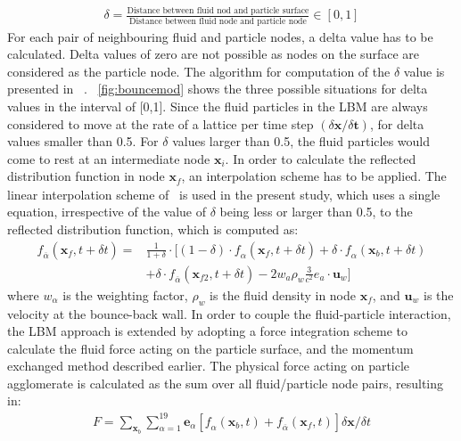 \begin{eqnarray}
\delta = \frac{\mbox{Distance between fluid nod and particle surface}}{\mbox{Distance between fluid node and particle node}} \in [0,1]
\end{eqnarray} 
For each pair of neighbouring fluid and particle nodes, a delta value has to be calculated. Delta values of zero are not possible as nodes on the surface are considered as the particle node. The algorithm for computation of the $\delta$ value is presented in ~\citet{Iglberger2008}. ~\cref{fig:bouncemod} shows the three possible situations for delta values in the interval of [0,1]. Since the fluid particles in the LBM are always considered to move at the rate of a lattice per time step $(\delta \mathbf{x}/ \delta \mathbf{t})$, for delta values smaller than 0.5. For $\delta$ values larger than 0.5, the fluid particles would come to rest at an intermediate node $\mathbf{x}_{\mathit{i}}$. In order to calculate the reflected distribution function in node $\mathbf{x}_{\mathit{f}}$, an interpolation scheme has to be applied. The linear interpolation scheme of~\citet{Yu2003a, Yu2003} is used in the present study, which uses a single equation, irrespective of the value of $\delta$ being less or larger than 0.5, to the reflected distribution function, which is computed as:
\begin{eqnarray}
 \nonumber
\mathit{\mathit{f}}_{\overline{\alpha}}(\mathbf{x}_{\mathit{f}},t + \delta t) = & \frac{1}{1 + \delta} \cdot [(1-\delta)\cdot \mathit{\mathit{f}}_{\alpha}(\mathbf{x}_{\mathit{f}},t + \delta t) + \delta \cdot \mathit{\mathit{f}}_{\alpha}(\mathbf{x}_{\mathit{b}},t + \delta t)  \\
& + \delta \cdot \mathit{\mathit{f}}_{\overline{\alpha}}(\mathbf{x}_{\mathit{f2}},t + \delta t) -2\mathit{w}_{\mathit{a}}\rho_{\mathit{w}}\frac{3}{\mathit{c}^{2}}\mathbf{\mathit{e}}_{\mathit{a}}\cdot \mathbf{u}_{\mathit{w}}]
\end{eqnarray}
where $\mathit{w}_{\alpha}$ is the weighting factor, $\rho_{\mathit{w}}$ is the fluid density in node $\mathbf{x}_{\mathit{f}}$, and $ \mathbf{u}_{\mathit{w}}  $ is the velocity at the bounce-back wall. In order to couple the fluid-particle interaction, the LBM approach is extended by adopting a force integration scheme to calculate the fluid force acting on the particle surface, and the momentum exchanged method described earlier. The physical force acting on particle agglomerate is calculated as the sum over all fluid/particle node pairs, resulting in: 
\begin{eqnarray}
\mathit{F} = \sum\limits_{\mathbf{x}_{b}}\sum\limits_{\alpha=1}^{19}{\mathbf{e}_{\alpha}[\mathit{f}_{\alpha}(\mathbf{x}_{b},t)+\mathit{f}_{\overline{\alpha}}(\mathbf{x}_{f},t)] \delta \mathbf{x} / \delta t}
\end{eqnarray}
